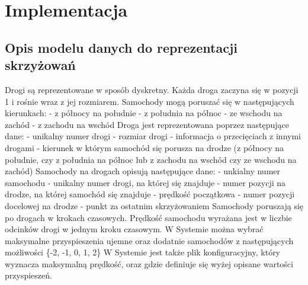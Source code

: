 \chapter{Implementacja} \label{chap:implementation}

\section{Opis modelu danych do reprezentacji skrzyżowań}

Drogi są reprezentowane w sposób dyskretny. Każda droga zaczyna się w pozycji 1 i rośnie wraz z jej rozmiarem. 
\newline
Samochody mogą poruszać się w następujących kierunkach:
\newline
- z północy na południe
\newline
- z południa na północ
\newline
- ze wschodu na zachód
\newline
- z zachodu na wschód
\newline
\newline
Droga jest reprezentowana poprzez następujące dane:
\newline
- unikalny numer drogi
\newline
- rozmiar drogi
\newline
- informacja o przecięciach z innymi drogami
\newline
- kierunek w którym samochód się porusza na drodze (z północy na południe, czy z południa na północ lub z zachodu na wschód czy ze wschodu na zachód)
\newline
\newline
Samochody na drogach opisują następujące dane:
\newline
- unkialny numer samochodu
\newline
- unikalny numer drogi, na której się znajduje
\newline
- numer pozycji na drodze, na której samochód się znajduje
\newline
- prędkość początkowa
\newline
- numer pozycji docelowej na drodze - punkt za ostatnim skrzyżowaniem
\newline
\newline
Samochody poruszają się po drogach w krokach czasowych. Prędkość samochodu wyrażana jest w liczbie odcinków drogi w jednym kroku czasowym.
\newline
\newline
W Systemie można wybrać maksymalne przyspieszenia ujemne oraz dodatnie samochodów z następujących możliwości \{-2, -1, 0, 1, 2\}
\newline
\newline
W Systemie jest także plik konfiguracyjny, który wyznacza maksymalną prędkość, oraz gdzie definiuje się wyżej opisane wartości przyspieszeń.

